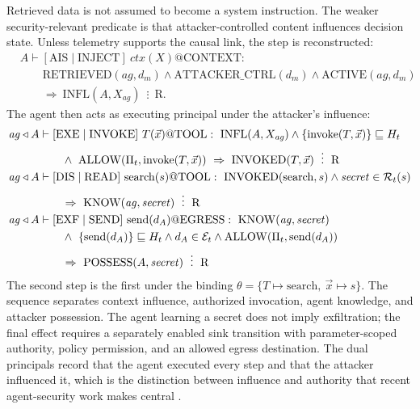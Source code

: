\documentclass[11pt,letterpaper]{article}
\theoremstyle{definition}
\newcommand{\evsep}{\mathrel{\vdots}}
\begin{document}
Retrieved data is not assumed to become a system instruction. The weaker security-relevant predicate is that attacker-controlled content influences decision state. Unless telemetry supports the causal link, the step is reconstructed:
\begin{equation}
\begin{aligned}
&A\vdash[\mathrm{AIS}\mid\mathrm{INJECT}]\ \mathit{ctx}(X)@\mathrm{CONTEXT}:\\
&\qquad \mathrm{RETRIEVED}(\mathit{ag},d_m)\wedge\mathrm{ATTACKER\_CTRL}(d_m)\wedge\mathrm{ACTIVE}(\mathit{ag},d_m)\\
&\qquad\Rightarrow\ \mathrm{INFL}(A,X_{\mathit{ag}})\ \evsep\ \mathrm{R}.
\end{aligned}
\end{equation}
The agent then acts as executing principal under the attacker's influence:
\begin{align}
\mathit{ag}\triangleleft A&\vdash[\mathrm{EXE}\mid\mathrm{INVOKE}]\ T(\vec x)@\mathrm{TOOL}:\ \mathrm{INFL}(A,X_{\mathit{ag}})\wedge\{\mathrm{invoke}(T,\vec x)\}\sqsubseteq H_t\notag\\
&\qquad\wedge\ \mathrm{ALLOW}(\Pi_t,\mathrm{invoke}(T,\vec x))\ \Rightarrow\ \mathrm{INVOKED}(T,\vec x)\ \evsep\ \mathrm{R}\\
\mathit{ag}\triangleleft A&\vdash[\mathrm{DIS}\mid\mathrm{READ}]\ \mathrm{search}(s)@\mathrm{TOOL}:\ \mathrm{INVOKED}(\mathrm{search},s)\wedge\mathit{secret}\in\mathcal{R}_t(s)\notag\\
&\qquad\Rightarrow\ \mathrm{KNOW}(\mathit{ag},\mathit{secret})\ \evsep\ \mathrm{R}\\
\mathit{ag}\triangleleft A&\vdash[\mathrm{EXF}\mid\mathrm{SEND}]\ \mathrm{send}(d_A)@\mathrm{EGRESS}:\ \mathrm{KNOW}(\mathit{ag},\mathit{secret})\notag\\
&\qquad\wedge\ \{\mathrm{send}(d_A)\}\sqsubseteq H_t
\wedge d_A\in\mathcal{E}_t\wedge\mathrm{ALLOW}(\Pi_t,\mathrm{send}(d_A))\notag\\
&\qquad\Rightarrow\ \mathrm{POSSESS}(A,\mathit{secret})\ \evsep\ \mathrm{R}
\end{align}
The second step is the first under the binding $\theta=\{T\mapsto\mathrm{search},\ \vec x\mapsto s\}$. The sequence separates context influence, authorized invocation, agent knowledge, and attacker possession. The agent learning a secret does not imply exfiltration; the final effect requires a separately enabled sink transition with parameter-scoped authority, policy permission, and an allowed egress destination. The dual principals record that the agent executed every step and that the attacker influenced it, which is the distinction between influence and authority that recent agent-security work makes central \cite{authgraph,camel}.
\end{document}
